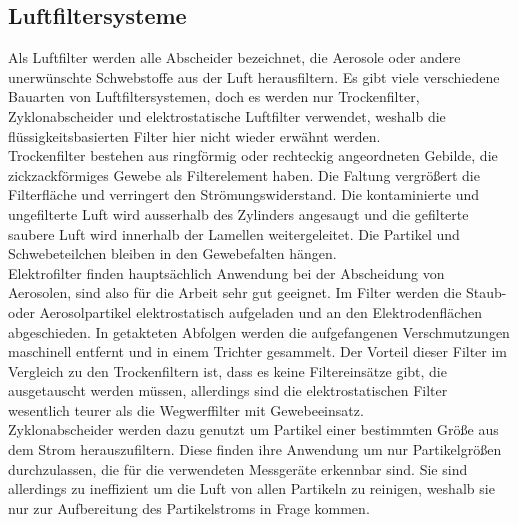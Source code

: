 \subsection{Luftfiltersysteme}
Als Luftfilter werden alle Abscheider bezeichnet, die Aerosole oder andere unerw\"{u}nschte Schwebstoffe aus der Luft herausfiltern. Es gibt viele verschiedene Bauarten von Luftfiltersystemen, doch es werden nur Trockenfilter, Zyklonabscheider und elektrostatische Luftfilter verwendet, weshalb die fl\"{u}ssigkeitsbasierten Filter hier nicht wieder erw\"{a}hnt werden. \\
Trockenfilter bestehen aus ringf\"{o}rmig oder rechteckig angeordneten Gebilde, die zickzackf\"{o}rmiges Gewebe als Filterelement haben. Die Faltung vergr\"{o}{\ss}ert die Filterfl\"{a}che und verringert den Str\"{o}mungswiderstand. Die kontaminierte und ungefilterte Luft wird ausserhalb des Zylinders angesaugt und die gefilterte saubere Luft wird innerhalb der Lamellen weitergeleitet. Die Partikel und Schwebeteilchen bleiben in den Gewebefalten h\"{a}ngen.\\
Elektrofilter finden haupts\"{a}chlich Anwendung bei der Abscheidung von Aerosolen, sind also f\"{u}r die Arbeit sehr gut geeignet. Im Filter werden die Staub- oder Aerosolpartikel elektrostatisch aufgeladen und an den Elektrodenfl\"{a}chen abgeschieden. In getakteten Abfolgen werden die aufgefangenen Verschmutzungen maschinell entfernt und in einem Trichter gesammelt. Der Vorteil dieser Filter im Vergleich zu den Trockenfiltern ist, dass es keine Filtereins\"{a}tze gibt, die ausgetauscht werden m\"{u}ssen, allerdings sind die elektrostatischen Filter wesentlich teurer als die Wegwerffilter mit Gewebeeinsatz.\\
Zyklonabscheider werden dazu genutzt um Partikel einer bestimmten Gr\"{o}{\ss}e aus dem Strom herauszufiltern. Diese finden ihre Anwendung um nur Partikelgr\"{o}{\ss}en durchzulassen, die f\"{u}r die verwendeten Messger\"{a}te erkennbar sind. Sie sind allerdings zu ineffizient um die Luft von allen Partikeln zu reinigen, weshalb sie nur zur Aufbereitung des Partikelstroms in Frage kommen\cite{filter}.

